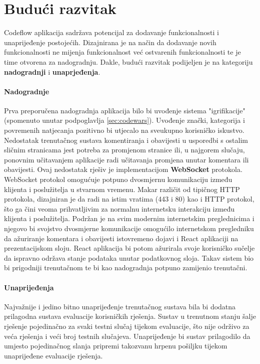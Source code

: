 \documentclass[times, utf8, zavrsni]{fer}
\begin{document}
	\chapter{Budući razvitak}
	Codeflow aplikacija sadržava potencijal za dodavanje funkcionalnosti i unaprijeđenje postojećih. Dizajnirana je na način da dodavanje novih funkcionalnosti ne mijenja funkcionalnost već ostvarenih funkcionalnosti te je time otvorena za nadogradnju. Dakle, budući razvitak podijeljen je na kategoriju \textbf{nadogradnji} i \textbf{unaprjeđenja}.
	\subsubsection{Nadogradnje}
	Prva preporučena nadogradnja aplikacija bilo bi uvođenje sistema "igrifikacije" (spomenuto unutar podpoglavlja \ref{sec:codewars}). Uvođenje znački, kategorija i povremenih natjecanja pozitivno bi utjecalo na sveukupno korisničko iskustvo.\\
	Nedostatak trenutačnog sustava komentiranja i obavijesti u usporedbi s ostalim sličnim stranicama jest potreba za promjenom stranice ili, u najgorem slučaju, ponovnim učitavanjem aplikacije radi učitavanja promjena unutar komentara ili obavijesti. Ovaj nedostatak rješiv je implementacijom \textbf{WebSocket} protokola. WebSocket protokol omogućuje potpuno dvosmjernu komunikaciju između klijenta i poslužitelja u stvarnom vremenu. Makar različit od tipičnog HTTP protokola, dizajniran je da radi na istim vratima  (443 i 80) kao i HTTP protokol, što ga čini veoma prihvatljivim za normalnu internetsku interakciju između klijenta i poslužitelja. Podržan je na svim modernim internetskim preglednicima i njegovo bi svojstvo dvosmjerne komunikacije omogućilo internetskom pregledniku da ažuriranje komentara i obavijesti istovremeno dojavi i React aplikaciji na prezentacijskom sloju. React aplikacija bi potom ažurirala svoje korisničko sučelje da ispravno održava stanje podataka unutar podatkovnog sloja. Takav sistem bio bi prigodniji trenutačnom te bi kao nadogradnja potpuno zamijenio trenutačni.
	\subsubsection{Unaprijeđenja}
	Najvažnije i jedino bitno unaprijeđenje trenutačnog sustava bila bi dodatna prilagodna sustava evaluacije korisničkih rješenja. Sustav u trenutnom stanju šalje rješenje pojedinačno za svaki testni slučaj tijekom evaluacije, što nije održivo za veća rješenja i veći broj testnih slučajeva. Unaprijeđenje bi sustav prilagodilo da umjesto pojedinačnog slanja pripremi takozvanu hrpenu  pošiljku tijekom unaprijeđene evaluacije rješenja. 
	
\end{document}
